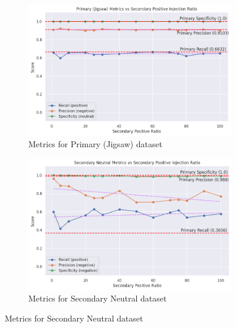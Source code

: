 \begin{figure}[ht]
    \centering
    \begin{subfigure}[b]{0.49\textwidth}
        \includegraphics[width=\textwidth]{graphs/ratio/combined/primary.png}
        \caption{Metrics for Primary (Jigsaw) dataset}
        \label{subfig:primary_metrics_comb}
    \end{subfigure}
    \hfill
    \begin{subfigure}[b]{0.49\textwidth}
        \includegraphics[width=\textwidth]{graphs/ratio/combined/sn.png}
        \caption{Metrics for Secondary Neutral dataset}
        \label{subfig:secondary_neutral_metrics_comb}
    \end{subfigure}

    \vspace{0.2cm}


\end{figure}
